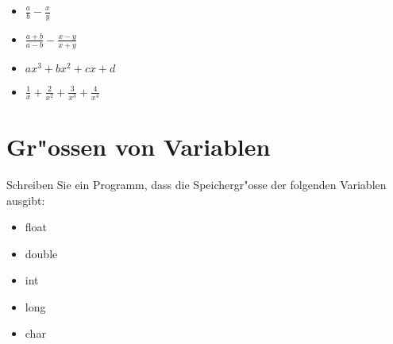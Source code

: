 \documentclass[a4paper,10pt]{article}
\begin{document}
\begin{itemize}
\item $\frac{a}{b} - \frac{x}{y}$

\item $\frac{a+b}{a-b} - \frac{x-y}{x+y}$

\item $ax^{3}+bx^{2}+cx+d$

\item $\frac{1}{x}+\frac{2}{x^{2}}+\frac{3}{x^{3}}+\frac{4}{x^{4}}$
\end{itemize}


\section{Gr"ossen von Variablen}
Schreiben Sie ein Programm, dass die Speichergr"osse der folgenden Variablen ausgibt:

\begin{itemize}
\item float
\item double
\item int
\item long
\item char
\end{itemize}
\end{document}
